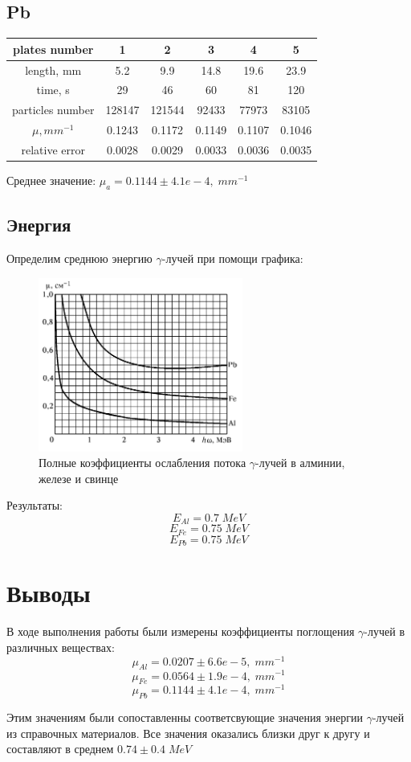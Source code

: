 \documentclass{article}
\begin{document}
\subsection{Pb}

\begin{table}[!ht]
    \centering
    \begin{tabular}{|c|c|c|c|c|c|}
    \hline
        plates number & 1 & 2 & 3 & 4 & 5 \\ \hline
        length, mm & 5.2 & 9.9 & 14.8 & 19.6 & 23.9 \\ \hline
        time, s & 29 & 46 & 60 & 81 & 120 \\ \hline
        particles number & 128147 & 121544 & 92433 & 77973 & 83105 \\ \hline
        $\mu, mm^{-1}$ & 0.1243 & 0.1172 & 0.1149 & 0.1107 & 0.1046 \\ \hline
        relative error & 0.0028 & 0.0029 & 0.0033 & 0.0036 & 0.0035 \\ \hline
    \end{tabular}
\end{table}

Среднее значение: \(\mu_a = 0.1144 \pm 4.1e-4,\; mm^{-1}\)

\subsection{Энергия}
Определим среднюю энергию \(\gamma\)-лучей при помощи графика:

\begin{figure}[H]
	\centering
	\includegraphics[width=0.6\textwidth]{plot.png}
	\caption{Полные коэффициенты ослабления потока $\gamma$-лучей в алминии, железе и свинце}
\end{figure}

Результаты:
\[ E_{Al} = 0.7\; MeV \]
\[ E_{Fe} = 0.75\; MeV \]
\[ E_{Pb} = 0.75\; MeV \]

\section{Выводы}
В ходе выполнения работы были измерены коэффициенты поглощения \(\gamma\)-лучей в различных веществах:
\[ \mu_{Al} = 0.0207 \pm 6.6e-5,\; mm^{-1} \]
\[ \mu_{Fe} = 0.0564 \pm 1.9e-4,\; mm^{-1} \]
\[ \mu_{Pb} = 0.1144 \pm 4.1e-4,\; mm^{-1} \]

Этим значениям были сопоставленны соответсвующие значения энергии \(\gamma\)-лучей из справочных материалов.
Все значения оказались близки друг к другу и составляют в среднем \(0.74 \pm 0.4\; MeV\)
\end{document}
